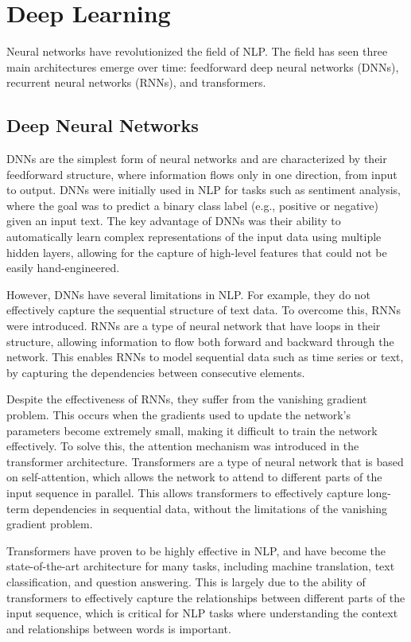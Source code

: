 \section{Deep Learning}

Neural networks have revolutionized the field of NLP. The field has seen three main architectures emerge over time: feedforward deep neural networks (DNNs), recurrent neural networks (RNNs), and transformers.

\subsection{Deep Neural Networks}
DNNs are the simplest form of neural networks and are characterized by their feedforward structure, where information flows only in one direction, from input to output.
DNNs were initially used in NLP for tasks such as sentiment analysis, where the goal was to predict a binary class label (e.g., positive or negative) given an input text.
The key advantage of DNNs was their ability to automatically learn complex representations of the input data using multiple hidden layers, allowing for the capture of high-level features that could not be easily hand-engineered.

However, DNNs have several limitations in NLP.
For example, they do not effectively capture the sequential structure of text data. To overcome this, RNNs were introduced.
RNNs are a type of neural network that have loops in their structure, allowing information to flow both forward and backward through the network.
This enables RNNs to model sequential data such as time series or text, by capturing the dependencies between consecutive elements.

Despite the effectiveness of RNNs, they suffer from the vanishing gradient problem.
This occurs when the gradients used to update the network's parameters become extremely small, making it difficult to train the network effectively.
To solve this, the attention mechanism was introduced in the transformer architecture.
Transformers are a type of neural network that is based on self-attention, which allows the network to attend to different parts of the input sequence in parallel.
This allows transformers to effectively capture long-term dependencies in sequential data, without the limitations of the vanishing gradient problem.

Transformers have proven to be highly effective in NLP, and have become the state-of-the-art architecture for many tasks, including machine translation, text classification, and question answering.
This is largely due to the ability of transformers to effectively capture the relationships between different parts of the input sequence, which is critical for NLP tasks where understanding the context and relationships between words is important.


